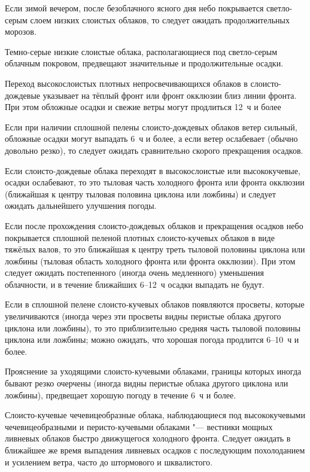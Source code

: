  Если зимой вечером, после безоблачного ясного дня небо
покрывается светло-серым слоем низких слоистых облаков, то следует
ожидать продолжительных морозов.

 Темно-серые низкие слоистые облака, располагающиеся под
светло-серым облачным покровом, предвещают значительные и
продолжительные осадки.

 Переход высокослоистых плотных непросвечивающихся облаков в
слоисто-дождевые указывает на тёплый фронт или фронт окклюзии близ
линии фронта. При этом обложные осадки и свежие ветры могут продлиться
12~ч и более

 Если при наличии сплошной пелены слоисто-дождевых облаков ветер
сильный, обложные осадки могут выпадать 6~ч и более, а если ветер
ослабевает (обычно довольно резко), то следует ожидать сравнительно
скорого прекращения осадков.

 Если слоисто-дождевые облака переходят в высокослоистые или
высококучевые, осадки ослабевают, то это тыловая часть холодного
фронта или фронта окклюзии (ближайшая к центру тыловая половина
циклона или ложбины) и следует ожидать дальнейшего улучшения погоды.

 Если после прохождения слоисто-дождевых облаков и прекращения
осадков небо покрывается сплошной пеленой плотных слоисто-кучевых
облаков в виде тяжёлых валов, то это ближайшая к центру треть тыловой
половины циклона или ложбины (тыловая область холодного фронта или
фронта окклюзии). При этом следует ожидать постепенного (иногда очень
медленного) уменьшения облачности, и в течение ближайших 6--12~ч
осадки выпадать не будут.

 Если в сплошной пелене слоисто-кучевых облаков появляются
просветы, которые увеличиваются (иногда через эти просветы видны
перистые облака другого циклона или ложбины), то это приблизительно
средняя часть тыловой половины циклона или ложбины; можно ожидать, что
хорошая погода продлится 6--10~ч и более.

 Прояснение за уходящими слоисто-кучевыми облаками, границы
которых иногда бывают резко очерчены (иногда видны перистые облака
другого циклона или ложбины), предвещает хорошую погоду в течение 6~ч
и более.

 Слоисто-кучевые чечевицеобразные облака, наблюдающиеся под
высококучевыми чечевицеобразными и перисто-кучевыми облаками "---
вестники мощных ливневых облаков быстро движущегося холодного
фронта. Следует ожидать в ближайшее же время выпадения ливневых осадков
с последующим похолоданием и усилением ветра, часто до штормового и
шквалистого.

